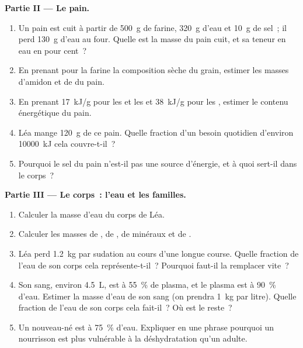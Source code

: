 \begin{problem}
\medskip
\noindent\textbf{Partie II --- Le pain.}
\begin{enumerate}[resume]
  \item Un pain est cuit à partir de \qty{500}{g} de farine,
        \qty{320}{g} d'eau et \qty{10}{g} de sel~; il perd
        \qty{130}{g} d'eau au four. Quelle est la masse du pain cuit,
        et sa teneur en eau en pour cent~?
  \item En prenant pour la farine la composition sèche du grain,
        estimer les masses d'amidon et de  du pain.
  \item En prenant \qty{17}{kJ/g} pour les  et les 
        et \qty{38}{kJ/g} pour les , estimer le contenu
        énergétique du pain.
  \item Léa mange \qty{120}{g} de ce pain. Quelle fraction d'un besoin
        quotidien d'environ \qty{10000}{kJ} cela couvre-t-il~?
  \item Pourquoi le sel du pain n'est-il pas une source d'énergie, et
        à quoi sert-il dans le corps~?
\end{enumerate}

\medskip
\noindent\textbf{Partie III --- Le corps~: l'eau et les familles.}
\begin{enumerate}[resume]
  \item Calculer la masse d'eau du corps de Léa.
  \item Calculer les masses de , de , de minéraux et
        de .
  \item Léa perd \qty{1.2}{kg} par sudation au cours d'une longue
        course. Quelle fraction de l'eau de son corps cela
        représente-t-il~? Pourquoi faut-il la remplacer vite~?
  \item Son sang, environ \qty{4.5}{L}, est à 55~\% de plasma, et le
        plasma est à 90~\% d'eau. Estimer la masse d'eau de son sang
        (on prendra \qty{1}{kg} par litre). Quelle fraction de l'eau
        de son corps cela fait-il~? Où est le reste~?
  \item Un nouveau-né est à 75~\% d'eau. Expliquer en une phrase
        pourquoi un nourrisson est plus vulnérable à la déshydratation
        qu'un adulte.
\end{enumerate}


\end{problem}
